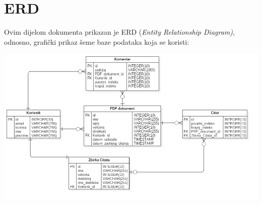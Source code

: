 \chapter{ERD}

Ovim dijelom dokumenta prikazan je ERD (\textit{Entity Relationship Diagram)}, odnosno, grafički prikaz šeme baze podataka koja se koristi:

\begin{center}
    \includegraphics[scale=0.5]{images/ERDDiagram.png}
\end{center}